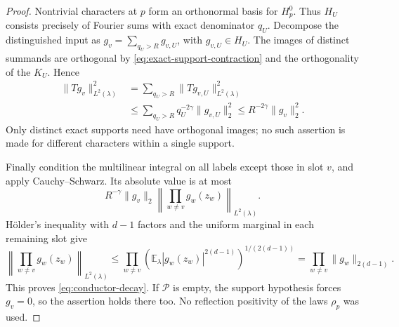 \begin{proof}
Nontrivial characters at \(p\) form an orthonormal basis for \(H_p^0\).
Thus \(H_U\) consists precisely of Fourier sums with exact denominator
\(q_U\).  Decompose the distinguished input as
\(g_v=\sum_{q_U>R}g_{v,U}\), with \(g_{v,U}\in H_U\).  The
images of distinct summands are orthogonal by
\eqref{eq:exact-support-contraction} and the orthogonality of the
\(K_U\).  Hence
\begin{align*}
 \|Tg_v\|_{L^2(\lambda)}^2
 &=\sum_{q_U>R}\|Tg_{v,U}\|_{L^2(\lambda)}^2\\
 &\le\sum_{q_U>R}q_U^{-2\gamma}\|g_{v,U}\|_2^2
 \le R^{-2\gamma}\|g_v\|_2^2.
\end{align*}
Only distinct exact supports need have orthogonal images; no such
assertion is made for different characters within a single support.

Finally condition the multilinear integral on all labels except those
in slot \(v\), and apply Cauchy--Schwarz.  Its absolute value is at most
\[
 R^{-\gamma}\|g_v\|_2
 \left\|\prod_{w\ne v}g_w(z_w)\right\|_{L^2(\lambda)}.
\]
H\"older's inequality with \(d-1\) factors and the uniform marginal
in each remaining slot give
\[
 \left\|\prod_{w\ne v}g_w(z_w)\right\|_{L^2(\lambda)}
 \le\prod_{w\ne v}
       \left(\mathbb E_{\lambda}|g_w(z_w)|^{2(d-1)}\right)^{1/(2(d-1))}
 =\prod_{w\ne v}\|g_w\|_{2(d-1)}.
\]
This proves \eqref{eq:conductor-decay}.  If \(\mathcal P\) is empty,
the support hypothesis forces \(g_v=0\), so the assertion holds there
too.  No reflection positivity of the laws \(\rho_p\) was used.
\end{proof}

